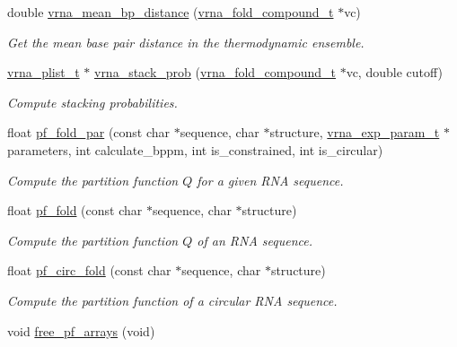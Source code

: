 \begin{DoxyCompactItemize}
double \hyperlink{group__pf__fold_gaa6b8983b559b9ef4b2e1b31113ea317b}{vrna\-\_\-mean\-\_\-bp\-\_\-distance} (\hyperlink{group__fold__compound_ga1b0cef17fd40466cef5968eaeeff6166}{vrna\-\_\-fold\-\_\-compound\-\_\-t} $\ast$vc)
\begin{DoxyCompactList}\small\item\em Get the mean base pair distance in the thermodynamic ensemble. \end{DoxyCompactList}\item 
\hyperlink{group__data__structures_ga8e4eb5e1bfc95776559575beb359af87}{vrna\-\_\-plist\-\_\-t} $\ast$ \hyperlink{group__pf__fold_ga26e3cc2eb127a35625572e9275c24ee4}{vrna\-\_\-stack\-\_\-prob} (\hyperlink{group__fold__compound_ga1b0cef17fd40466cef5968eaeeff6166}{vrna\-\_\-fold\-\_\-compound\-\_\-t} $\ast$vc, double cutoff)
\begin{DoxyCompactList}\small\item\em Compute stacking probabilities. \end{DoxyCompactList}\item 
float \hyperlink{group__pf__fold_gac4f95bee734b2563a3d6e9932117ebdf}{pf\-\_\-fold\-\_\-par} (const char $\ast$sequence, char $\ast$structure, \hyperlink{group__energy__parameters_ga01d8b92fe734df8d79a6169482c7d8d8}{vrna\-\_\-exp\-\_\-param\-\_\-t} $\ast$parameters, int calculate\-\_\-bppm, int is\-\_\-constrained, int is\-\_\-circular)
\begin{DoxyCompactList}\small\item\em Compute the partition function $Q$ for a given R\-N\-A sequence. \end{DoxyCompactList}\item 
float \hyperlink{group__pf__fold_gadc3db3d98742427e7001a7fd36ef28c2}{pf\-\_\-fold} (const char $\ast$sequence, char $\ast$structure)
\begin{DoxyCompactList}\small\item\em Compute the partition function $Q$ of an R\-N\-A sequence. \end{DoxyCompactList}\item 
float \hyperlink{group__pf__fold_ga819ce5fca8984004ac81c4a3b04cb735}{pf\-\_\-circ\-\_\-fold} (const char $\ast$sequence, char $\ast$structure)
\begin{DoxyCompactList}\small\item\em Compute the partition function of a circular R\-N\-A sequence. \end{DoxyCompactList}\item 
void \hyperlink{group__pf__fold_gae73db3f49a94f0f72e067ecd12681dbd}{free\-\_\-pf\-\_\-arrays} (void)

\end{DoxyCompactItemize}
